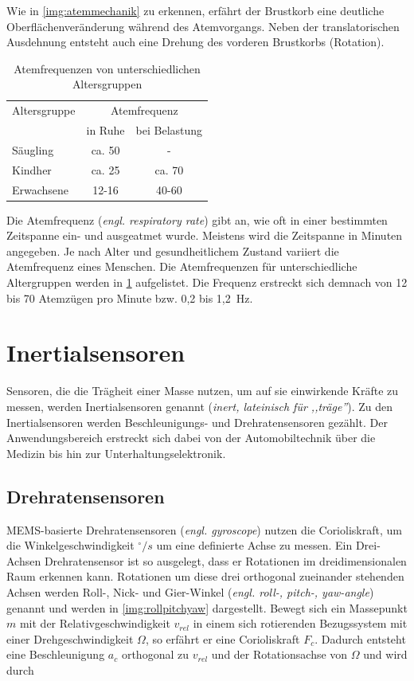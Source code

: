 Wie in \ref{img:atemmechanik} zu erkennen, erfährt der Brustkorb eine deutliche Oberflächenveränderung während des Atemvorgangs. Neben der translatorischen Ausdehnung entsteht auch eine Drehung des vorderen Brustkorbs (Rotation).

\begin{table}[h!]
	\centering
	\caption{Atemfrequenzen von unterschiedlichen Altersgruppen}
	\label{tab:atemfrequenz}
	\begin{tabular}{lcc}
		\toprule
		Altersgruppe 	& \multicolumn{2}{c}{Atemfrequenz}\\
						& in Ruhe	& bei Belastung\\
		\midrule
		Säugling		& ca. 50 	& -\\
		Kindher			& ca. 25 	& ca. 70\\
		Erwachsene		& 12-16		& 40-60\\
		\bottomrule
	\end{tabular}
\end{table}

Die Atemfrequenz (\textit{engl. respiratory rate}) gibt an, wie oft in einer bestimmten Zeitspanne ein- und ausgeatmet wurde. Meistens wird die Zeitspanne in Minuten angegeben. Je nach Alter und gesundheitlichem Zustand variiert die Atemfrequenz eines Menschen. Die Atemfrequenzen für unterschiedliche Altergruppen werden in \ref{tab:atemfrequenz} aufgelistet\cite{juergen-weineck}. Die Frequenz erstreckt sich demnach von 12 bis 70 Atemzügen pro Minute bzw. 0,2 bis 1,2~Hz.

\section{Inertialsensoren}
Sensoren, die die Trägheit einer Masse nutzen, um auf sie einwirkende Kräfte zu messen, werden Inertialsensoren genannt (\textit{inert, lateinisch für ,,träge''}). Zu den Inertialsensoren werden Beschleunigungs- und Drehratensensoren gezählt. Der Anwendungsbereich erstreckt sich dabei von der Automobiltechnik über die Medizin bis hin zur Unterhaltungselektronik\cite{sensortechnik}.

	\subsection{Drehratensensoren}	
	MEMS-basierte Drehratensensoren (\textit{engl. gyroscope}) nutzen die Corioliskraft, um die Winkelgeschwindigkeit $^\circ/s$ um eine definierte Achse zu messen. Ein Drei-Achsen Drehratensensor ist so ausgelegt, dass er Rotationen im dreidimensionalen Raum erkennen kann. Rotationen um diese drei orthogonal zueinander stehenden Achsen werden Roll-, Nick- und Gier-Winkel (\textit{engl. roll-, pitch-, yaw-angle}) genannt und werden in \ref{img:rollpitchyaw} dargestellt. Bewegt sich ein Massepunkt $m$ mit der Relativgeschwindigkeit $v_{rel}$ in einem sich rotierenden Bezugssystem mit einer Drehgeschwindigkeit $\Omega$, so erfährt er eine Corioliskraft $F_c$. Dadurch entsteht eine Beschleunigung $a_c$ orthogonal zu $v_{rel}$ und der Rotationsachse von $\Omega$ und wird durch


